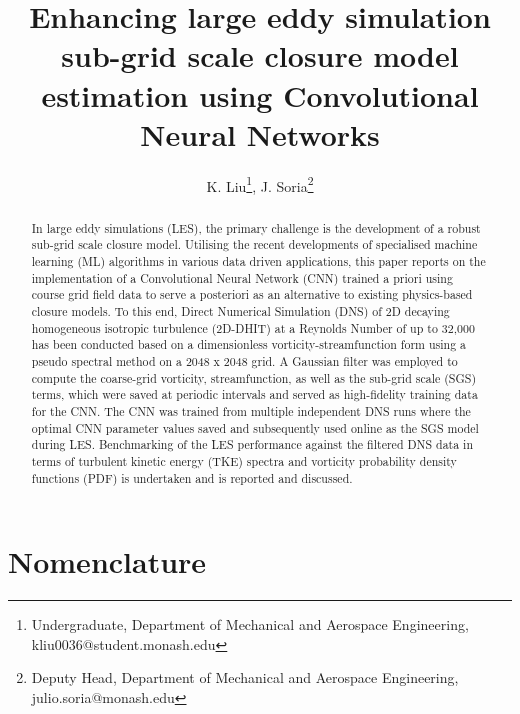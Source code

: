 \documentclass[conf]{new-aiaa}
\title{Enhancing large eddy simulation sub-grid scale closure model estimation using Convolutional Neural Networks}
\author{K. Liu\footnote{Undergraduate, Department of Mechanical and Aerospace Engineering, kliu0036@student.monash.edu}, J. Soria\footnote{Deputy Head, Department of Mechanical and Aerospace Engineering, julio.soria@monash.edu}}
\affil{Monash University, Melbourne, Victoria, 3800, Australia}
\begin{document}
\maketitle

\begin{abstract}
    In large eddy simulations (LES), the primary challenge is the development of a robust sub-grid scale closure model. Utilising the recent developments of specialised machine learning (ML) algorithms in various data driven applications, this paper reports on the implementation of a Convolutional Neural Network (CNN) trained a priori using course grid field data to serve a posteriori as an alternative to existing physics-based closure models. To this end, Direct Numerical Simulation (DNS) of 2D decaying homogeneous isotropic turbulence (2D-DHIT) at a Reynolds Number of up to 32,000 has been conducted based on a dimensionless vorticity-streamfunction form using a pseudo spectral method on a 2048 x 2048 grid. A Gaussian filter was employed to compute the coarse-grid vorticity, streamfunction, as well as the sub-grid scale (SGS) terms, which were saved at periodic intervals and served as high-fidelity training data for the CNN. The CNN was trained from multiple independent DNS runs where the optimal CNN parameter values saved and subsequently used online as the SGS model during LES. Benchmarking of the LES performance against the filtered DNS data in terms of turbulent kinetic energy (TKE) spectra and vorticity probability density functions (PDF) is undertaken and is reported and discussed.
\end{abstract}

\section*{Nomenclature}
\end{document}
